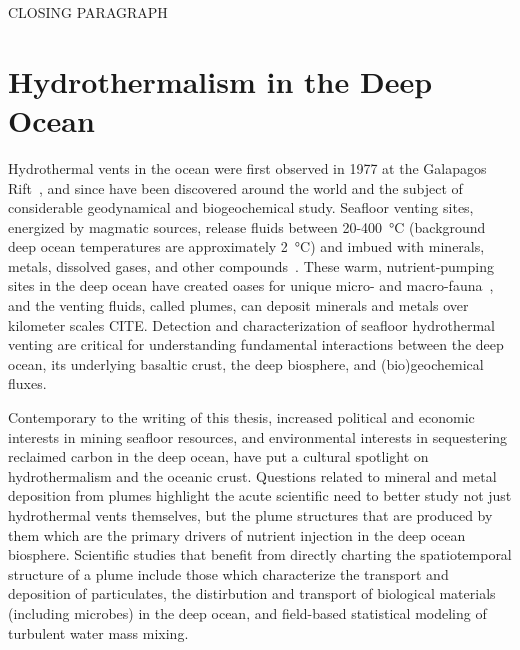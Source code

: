 CLOSING PARAGRAPH




\section{Hydrothermalism in the Deep Ocean}
\label{sec:charting-plumes}
Hydrothermal vents in the ocean were first observed in 1977 at the Galapagos Rift~\autocite{corliss1979submarine}, and since have been discovered around the world and the subject of considerable geodynamical and biogeochemical study.
Seafloor venting sites, energized by magmatic sources, release fluids between 20-\SI{400}{\celsius} (background deep ocean temperatures are approximately \SI{2}{\celsius}) and imbued with minerals, metals, dissolved gases, and other compounds~\autocite{jannasch1985geomicrobiology, martin2008hydrothermal}.
These warm, nutrient-pumping sites in the deep ocean have created oases for unique micro- and macro-fauna~\autocite{corliss1979submarine}, and the venting fluids, called plumes, can deposit minerals and metals over kilometer scales CITE.
Detection and characterization of seafloor hydrothermal venting are critical for  understanding fundamental interactions between the deep ocean, its underlying basaltic crust, the deep biosphere, and (bio)geochemical fluxes.

Contemporary to the writing of this thesis, increased political and economic interests in mining seafloor resources, and environmental interests in sequestering reclaimed carbon in the deep ocean, have put a cultural spotlight on hydrothermalism and the oceanic crust.
Questions related to mineral and metal deposition from plumes highlight the acute scientific need to better study not just hydrothermal vents themselves, but the plume structures that are produced by them which are the primary drivers of nutrient injection in the deep ocean biosphere.
Scientific studies that benefit from directly charting the spatiotemporal structure of a plume include those which characterize the transport and deposition of particulates, the distirbution and transport of biological materials (including microbes) in the deep ocean, and field-based statistical modeling of turbulent water mass mixing.


